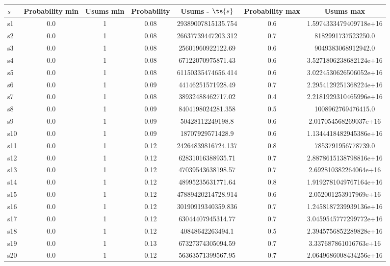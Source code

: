 \documentclass{article}
\begin{document}
\noindent\begin{tabular}{|l|c|c|c|c|c|c|}
\hline
$s$& Probability min & Usums min & Probability & Usums - $\ts{s}$ & Probability max & Usums max\\
\hline
s1 &0.0 & 1 & 0.08 & 29389007815135.754 & 0.6 & 1.5974333479409718e+16\\
\hline
s2 &0.0 & 1 & 0.08 & 26637739447203.312 & 0.7 & 8182991737523250.0\\
\hline
s3 &0.0 & 1 & 0.08 & 25601960922122.69 & 0.6 & 9049383068912942.0\\
\hline
s4 &0.0 & 1 & 0.08 & 67122070975871.43 & 0.6 & 3.5271806238682124e+16\\
\hline
s5 &0.0 & 1 & 0.08 & 61150335474656.414 & 0.6 & 3.0224530626506052e+16\\
\hline
s6 &0.0 & 1 & 0.09 & 44146251571928.49 & 0.7 & 2.2954129251368224e+16\\
\hline
s7 &0.0 & 1 & 0.08 & 38932488462717.02 & 0.4 & 2.2181929310465996e+16\\
\hline
s8 &0.0 & 1 & 0.09 & 8404198024281.358 & 0.5 & 1008962769476415.0\\
\hline
s9 &0.0 & 1 & 0.09 & 50428112249198.8 & 0.6 & 2.017054568269037e+16\\
\hline
s10 &0.0 & 1 & 0.09 & 18707929571428.9 & 0.6 & 1.1344418482945386e+16\\
\hline
s11 &0.0 & 1 & 0.12 & 24264839816724.137 & 0.8 & 7853791956778739.0\\
\hline
s12 &0.0 & 1 & 0.12 & 62831016388935.71 & 0.7 & 2.8878615138798816e+16\\
\hline
s13 &0.0 & 1 & 0.12 & 47039543638198.57 & 0.7 & 2.692810382264064e+16\\
\hline
s14 &0.0 & 1 & 0.12 & 48995235631771.64 & 0.8 & 1.9192781049767164e+16\\
\hline
s15 &0.0 & 1 & 0.12 & 47889420214728.914 & 0.6 & 2.052001253917969e+16\\
\hline
s16 &0.0 & 1 & 0.12 & 30190919340359.836 & 0.7 & 1.2458187239939136e+16\\
\hline
s17 &0.0 & 1 & 0.12 & 63044407945314.77 & 0.7 & 3.0459545777299772e+16\\
\hline
s18 &0.0 & 1 & 0.12 & 40848642263494.1 & 0.5 & 2.3945756852289828e+16\\
\hline
s19 &0.0 & 1 & 0.13 & 67327374305094.59 & 0.7 & 3.337687861016763e+16\\
\hline
s20 &0.0 & 1 & 0.12 & 56363571399567.95 & 0.7 & 2.0649686008434256e+16\\

\end{tabular}
\end{document}
